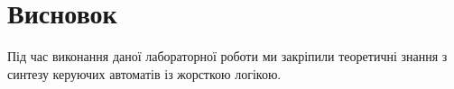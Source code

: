 \documentclass[a4paper,oneside,DIV=12,12pt]{scrartcl}
\begin{document}
	
	\section{Висновок}
		Під час виконання даної лабораторної роботи ми закріпили теоретичні знання з синтезу керуючих автоматів із жорсткою логікою.
\end{document}
